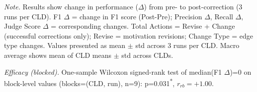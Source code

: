 \begin{table}[H]
\centering
\begin{minipage}{\linewidth}
\centering
\caption{Corrector Performance on Synthetically Corrupted Data (Baseline Prompt)}
\label{tab:rq1b_synthetic_correctness}
\begin{threeparttable}
\end{threeparttable}
\vspace{0.5em}
\footnotesize
\textit{Note.} Results show change in performance ($\Delta$) from pre- to post-correction (3 runs per CLD).
F1 $\Delta$ = change in F1 score (Post-Pre); Precision $\Delta$, Recall $\Delta$, Judge Score $\Delta$ = corresponding changes.
Total Actions = Revise + Change (successful corrections only); Revise = motivation revisions; Change Type = edge type changes.
Values presented as mean $\pm$ std across 3 runs per CLD. Macro average shows mean of CLD means $\pm$ std across CLDs.\par
\textit{Efficacy (blocked).} One-sample Wilcoxon signed-rank test of median(F1 $\Delta$)=0 on block-level values (blocks=(CLD, run), n=9): p=0.031\textsuperscript{*}, $r_{rb}=+1.00$.

\end{minipage}
\end{table}
